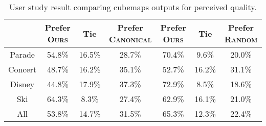 \begin{table}[t]
\centering

{\footnotesize \begin{tabular}{ cccc||ccc}
\toprule

& Prefer \textsc{Ours} &Tie& Prefer \textsc{Canonical} & Prefer \textsc{Ours} &Tie& Prefer \textsc{Random}  \\ \midrule
Parade & 54.8\%& 16.5\% &  28.7\%   & 70.4\%& 9.6\% &  20.0\%\\
Concert &48.7\%&16.2\%  &35.1\%     &52.7\%&16.2\%  &31.1\% \\
Disney &44.8\%&17.9\%  &37.3\%      &72.9\%&8.5\%  &18.6\%\\
Ski &64.3\%&8.3\%  &27.4\%          &62.9\%&16.1\%  &21.0\%\\
All &53.8\%&14.7\%&31.5\%           &65.3\%&12.3\%&22.4\%\\
\bottomrule

\end{tabular}}
\vspace{4pt}
\caption{User study result comparing cubemaps outputs for perceived quality. }



\label{tab:human_study}
\vspace{-15pt}
\end{table}






